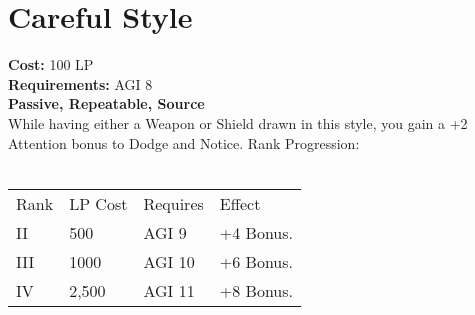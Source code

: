\section{Careful Style}\label{perk:carefulStyle}
\textbf{Cost:} 100 LP\\
\textbf{Requirements:} AGI 8\\
\textbf{Passive, Repeatable, Source}\\
While having either a Weapon or Shield drawn in this style, you gain a +2 Attention bonus to Dodge and Notice.
Rank Progression:\\
\\
\begin{tabular}{l | l | l | l}
    Rank & LP Cost & Requires & Effect\\
    II & 500 & AGI 9 & +4 Bonus.\\
    III & 1000 & AGI 10 & +6 Bonus.\\
    IV & 2,500 & AGI 11 & +8 Bonus.\\
\end{tabular}